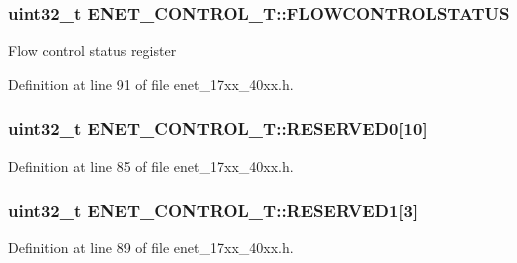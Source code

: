 \subsubsection[{\texorpdfstring{F\+L\+O\+W\+C\+O\+N\+T\+R\+O\+L\+S\+T\+A\+T\+US}{FLOWCONTROLSTATUS}}]{ uint32\+\_\+t E\+N\+E\+T\+\_\+\+C\+O\+N\+T\+R\+O\+L\+\_\+\+T\+::\+F\+L\+O\+W\+C\+O\+N\+T\+R\+O\+L\+S\+T\+A\+T\+US}\hypertarget{structENET__CONTROL__T_abe816b0eaea3b8dcb126cbe565d81ffb}{}\label{structENET__CONTROL__T_abe816b0eaea3b8dcb126cbe565d81ffb}
Flow control status register 

Definition at line 91 of file enet\+\_\+17xx\+\_\+40xx.\+h.

\subsubsection[{\texorpdfstring{R\+E\+S\+E\+R\+V\+E\+D0}{RESERVED0}}]{\setlength{\rightskip}{0pt plus 5cm}uint32\+\_\+t E\+N\+E\+T\+\_\+\+C\+O\+N\+T\+R\+O\+L\+\_\+\+T\+::\+R\+E\+S\+E\+R\+V\+E\+D0\mbox{[}10\mbox{]}}\hypertarget{structENET__CONTROL__T_a662f1911bc2db756493ef2dd77e83be5}{}\label{structENET__CONTROL__T_a662f1911bc2db756493ef2dd77e83be5}


Definition at line 85 of file enet\+\_\+17xx\+\_\+40xx.\+h.

\subsubsection[{\texorpdfstring{R\+E\+S\+E\+R\+V\+E\+D1}{RESERVED1}}]{\setlength{\rightskip}{0pt plus 5cm}uint32\+\_\+t E\+N\+E\+T\+\_\+\+C\+O\+N\+T\+R\+O\+L\+\_\+\+T\+::\+R\+E\+S\+E\+R\+V\+E\+D1\mbox{[}3\mbox{]}}\hypertarget{structENET__CONTROL__T_a83f993318d9638ea36fa88d8f5bcb957}{}\label{structENET__CONTROL__T_a83f993318d9638ea36fa88d8f5bcb957}


Definition at line 89 of file enet\+\_\+17xx\+\_\+40xx.\+h.

